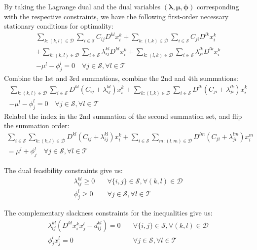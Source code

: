 By taking the Lagrange dual and the dual variables $(\boldsymbol{\lambda},\boldsymbol{\mu},\boldsymbol{\phi})$ corresponding with the respective constraints, we have the following first-order necessary stationary conditions for optimality:
\begin{align}
	\sum_{k:(k,l)\in\mathcal{D}}\sum_{i\in\mathcal{S}}C_{ij}D^{kl}x_i^k + \sum_{k:(l,k)\in\mathcal{D}}\sum_{i\in\mathcal{S}}C_{ji}D^{lk}x_i^k \nonumber \\
	+ \sum_{k:(k,l)\in\mathcal{D}}\sum_{i\in\mathcal{S}}\lambda_{ij}^{kl}D^{kl}x_i^k + \sum_{k:(l,k)\in\mathcal{D}}\sum_{i\in\mathcal{S}}\lambda_{ji}^{lk}D^{lk}x_i^k \nonumber \\
	- \mu^l - \phi_j^l = 0
	\quad \forall j\in\mathcal{S},\forall l\in\mathcal{T} \nonumber
\end{align}
Combine the 1st and 3rd summations, combine the 2nd and 4th summations:
\begin{align}
	\sum_{k:(k,l)\in\mathcal{D}}\sum_{i\in\mathcal{S}} D^{kl}(C_{ij} + \lambda_{ij}^{kl})x_i^k
	+ \sum_{k:(l,k)\in\mathcal{D}}\sum_{i\in\mathcal{S}} D^{lk}(C_{ji} + \lambda_{ji}^{lk})x_i^k \nonumber \\
	- \mu^l - \phi_j^l = 0
	\quad \forall j\in\mathcal{S},\forall l\in\mathcal{T} \nonumber
\end{align}
Relabel the index in the 2nd summation of the second summation set, and flip the summation order:
\begin{align}
	\sum_{i\in\mathcal{S}}\sum_{k:(k,l)\in\mathcal{D}} D^{kl}(C_{ij} + \lambda_{ij}^{kl})x_i^k
	+ \sum_{i\in\mathcal{S}}\sum_{m:(l,m)\in\mathcal{D}} D^{lm}(C_{ji} + \lambda_{ji}^{lm})x_i^m \nonumber \\
	= \mu^l + \phi_j^l
	\quad \forall j\in\mathcal{S},\forall l\in\mathcal{T} \label{eq:cond_stat}
\end{align}

The dual feasibility constraints give us:
\begin{subequations}\label{eq:cond_dual}
	\begin{align}
		\lambda_{ij}^{kl} \geq 0 & \quad \forall\{i,j\}\in\mathcal{S}, \forall(k,l)\in\mathcal{D} \label{eq:cond_dual_lambda} \\
		\phi_j^l \geq 0 & \quad \forall j\in\mathcal{S},\forall l\in\mathcal{T} \label{eq:cond_dual_phi}
	\end{align}
\end{subequations}

The complementary slackness constraints for the inequalities give us:
\begin{subequations}\label{eq:cond_cs}
	\begin{align}
		\lambda_{ij}^{kl}\left(D^{kl}x_i^kx_j^l - d_{ij}^{kl}\right) = 0 & \quad \forall\{i,j\}\in\mathcal{S}, \forall(k,l)\in\mathcal{D} \label{eq:cond_cs_duration} \\
		\phi_j^lx_j^l = 0 & \quad \forall j\in\mathcal{S},\forall l\in\mathcal{T} \label{eq:cond_cs_nonneg}
	\end{align}
\end{subequations}

